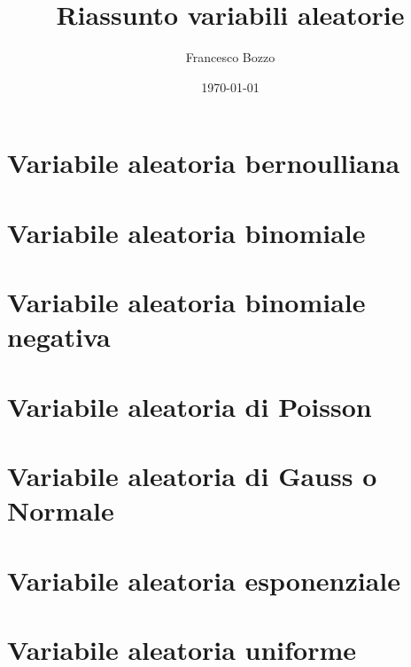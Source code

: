 \documentclass[
	,a4paper
	,12pt
	,oneside
]{article}
\begin{document}
\date{\today}
\title{Riassunto variabili aleatorie}
\author{Francesco Bozzo}
\maketitle

\section*{Variabile aleatoria bernoulliana}

\section*{Variabile aleatoria binomiale}

\section*{Variabile aleatoria binomiale negativa}

\section*{Variabile aleatoria di Poisson}

\section*{Variabile aleatoria di Gauss o Normale}

\section*{Variabile aleatoria esponenziale}

\section*{Variabile aleatoria uniforme}
\end{document}
